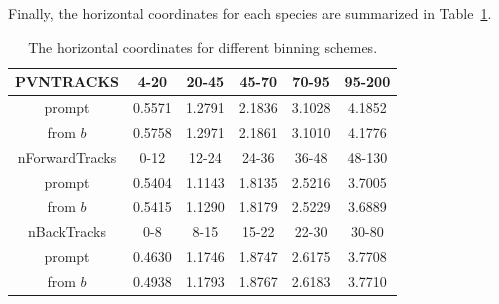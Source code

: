 Finally, the horizontal coordinates for each species are summarized in Table~\ref{XC}.
\begin{table}[H]
  \centering
  \caption{The horizontal coordinates for different binning schemes.}
\begin{center}
  \begin{tabular}{|c|ccccc|}
    \hline
    PVNTRACKS &  4-20 & 20-45  & 45-70   & 70-95   & 95-200   \\ \hline
    prompt & 0.5571 & 1.2791 & 2.1836 & 3.1028 & 4.1852 \\
    \hline
    from $b$ & 0.5758 & 1.2971 & 2.1861 & 3.1010 & 4.1776 \\
    \hline
    nForwardTracks &  0-12 & 12-24  & 24-36   & 36-48   & 48-130 \\ \hline
    prompt & 0.5404 & 1.1143 & 1.8135 & 2.5216 & 3.7005 \\
    \hline
    from $b$ & 0.5415 & 1.1290 & 1.8179 & 2.5229 & 3.6889 \\
    \hline
    nBackTracks &  0-8 & 8-15  & 15-22   & 22-30   & 30-80  \\ \hline
    prompt & 0.4630 & 1.1746 & 1.8747 & 2.6175 & 3.7708 \\
    \hline
    from $b$ & 0.4938 & 1.1793 & 1.8767 & 2.6183 & 3.7710 \\
    \hline
    \end{tabular}
\end{center}
\label{XC}
\end{table}
  
